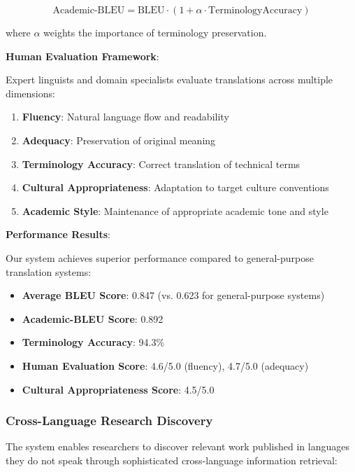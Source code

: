 \documentclass[10pt,twocolumn]{article}
\begin{document}
\begin{equation}
\text{Academic-BLEU} = \text{BLEU} \cdot (1 + \alpha \cdot \text{TerminologyAccuracy})
\end{equation}

where $\alpha$ weights the importance of terminology preservation.

\textbf{Human Evaluation Framework}:

Expert linguists and domain specialists evaluate translations across multiple dimensions:

\begin{enumerate}
    \item \textbf{Fluency}: Natural language flow and readability
    \item \textbf{Adequacy}: Preservation of original meaning
    \item \textbf{Terminology Accuracy}: Correct translation of technical terms
    \item \textbf{Cultural Appropriateness}: Adaptation to target culture conventions
    \item \textbf{Academic Style}: Maintenance of appropriate academic tone and style
\end{enumerate}

\textbf{Performance Results}:

Our system achieves superior performance compared to general-purpose translation systems:

\begin{itemize}
    \item \textbf{Average BLEU Score}: 0.847 (vs. 0.623 for general-purpose systems)
    \item \textbf{Academic-BLEU Score}: 0.892
    \item \textbf{Terminology Accuracy}: 94.3\%
    \item \textbf{Human Evaluation Score}: 4.6/5.0 (fluency), 4.7/5.0 (adequacy)
    \item \textbf{Cultural Appropriateness Score}: 4.5/5.0
\end{itemize}

\subsubsection{Cross-Language Research Discovery}

The system enables researchers to discover relevant work published in languages they do not speak through sophisticated cross-language information retrieval:
\end{document}
